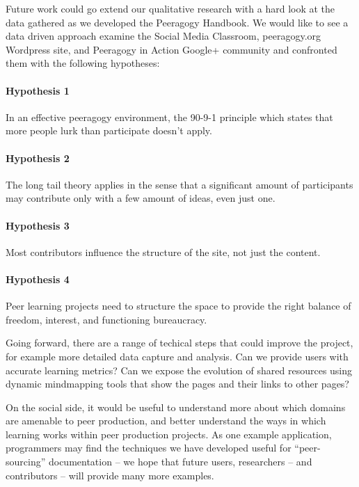 \documentclass{acm_proc_article-sp}
\begin{document}
Future work could go extend our qualitative research with a hard look
at the data gathered as we developed the Peeragogy Handbook.  We would
like to see a data driven approach examine the Social Media Classroom,
peeragogy.org Wordpress site, and Peeragogy in Action Google+
community and confronted them with the following hypotheses:

\paragraph{Hypothesis 1}
In an effective peeragogy environment, the 90-9-1 principle which
states that more people lurk than participate doesn't apply.

\paragraph{Hypothesis 2}
The long tail theory applies in the sense that a significant amount of
participants may contribute only with a few amount of ideas, even just
one.

\paragraph{Hypothesis 3}
Most contributors influence the structure of the site, not just the
content.

\paragraph{Hypothesis 4}
Peer learning projects need to structure the space to provide the
right balance of freedom, interest, and functioning bureaucracy.

Going forward, there are a range of techical steps that could improve
the project, for example more detailed data capture and analysis.  Can
we provide users with accurate learning metrics?  Can we expose the
evolution of shared resources using dynamic mindmapping tools that
show the pages and their links to other pages?

On the social side, it would be useful to understand more about which
domains are amenable to peer production, and better understand the
ways in which learning works within peer production projects.  As one
example application, programmers may find the techniques we have
developed useful for ``peer-sourcing'' documentation -- we hope that
future users, researchers -- and contributors -- will provide many
more examples.

\end{document}
